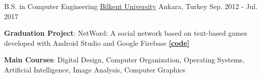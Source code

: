 \begin{cventries}
  \cventry
    {B.S. in Computer Engineering} %
    {\href{https://www.bilkent.edu.tr/}{Bilkent University}} %
    {Ankara, Turkey} %
    {Sep. 2012 - Jul. 2017} %
    {
      \begin{cvitems} %
        \item {\textbf{Graduation Project}: NetWord: A social network based on text-based games developed with Android Studio and Google Firebase \href{https://bitbucket.org/enverbashirov/networdclient}{\textbf{[code]}}}
        \item {\textbf{Main Courses}: Digital Design, Computer Organization, Operating Systems, Artificial Intelligence, Image Analysis, Computer Graphics}
      \end{cvitems}
    }

\end{cventries}
